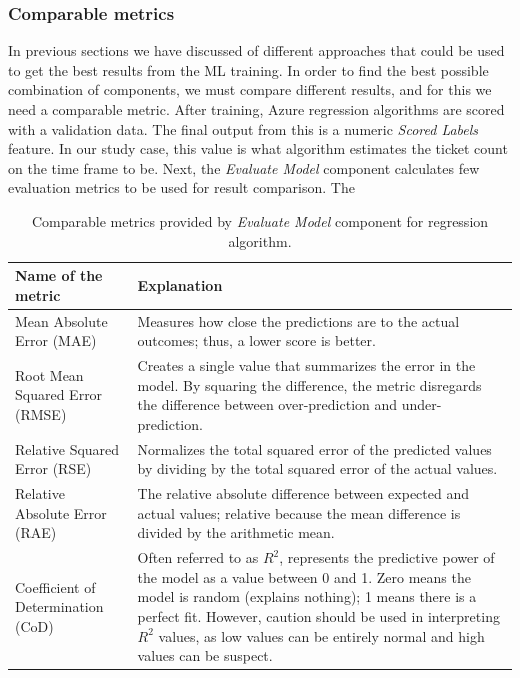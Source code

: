


\subsubsection*{Comparable metrics}

In previous sections we have discussed of different approaches that could be used
to get the best results from the ML training.
In order to find the best possible combination of components,
we must compare different results,
and for this we need a comparable metric.
After training,
Azure regression algorithms are scored with a validation data.
The final output from this is a numeric \textit{Scored Labels} feature.
In our study case,
this value is what algorithm estimates the ticket count on the time frame to be.
Next,
the \textit{Evaluate Model} component calculates few evaluation metrics
to be used for result comparison.
The

\setlength{\tabcolsep}{5pt}
\begin{table}[htb]
    \begin{tabularx}{\textwidth}{|L{0.35\textwidth}|X|}
        \hline
        \textbf{Name of the metric}             & \textbf{Explanation}  \\ \hline
        Mean Absolute Error (MAE)               & Measures how close the predictions are to the actual outcomes;
            thus, a lower score is better. \\ \hline
        Root Mean Squared Error (RMSE)          & Creates a single value that summarizes the error in the model.
            By squaring the difference, the metric disregards the difference between over-prediction and under-prediction. \\ \hline
        Relative Squared Error (RSE)            & Normalizes the total squared error of the predicted values
            by dividing by the total squared error of the actual values. \\ \hline
        Relative Absolute Error (RAE)           & The relative absolute difference between expected and actual values;
            relative because the mean difference is divided by the arithmetic mean. \\ \hline
        Coefficient of Determination (CoD)      & Often referred to as $R^{2}$,
            represents the predictive power of the model as a value between 0 and 1.
            Zero means the model is random (explains nothing);
            1 means there is a perfect fit.
            However, caution should be used in interpreting $R^{2}$ values,
            as low values can be entirely normal and high values can be suspect. \\ \hline
    \end{tabularx}
    \caption{Comparable metrics provided by \textit{Evaluate Model} component for regression algorithm.\cite{azure2021evaluate}}
    \label{tab:comparable-metrics}
\end{table}

